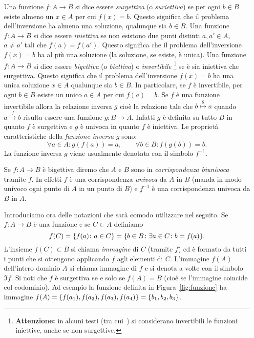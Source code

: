 Una funzione $f\colon A \to B$ si dice essere \emph{surgettiva}%
%
 (o \emph{suriettiva})
se per ogni $b\in B$ esiste almeno un $x\in A$ per cui $f(x)=b$. Questo
significa che il problema dell'inversione ha almeno una soluzione, qualunque
sia $b\in B$.
Una funzione $f\colon A \to B$ si dice essere \emph{iniettiva}%
%
se non esistono due punti distinti $a,a' \in A$, $a\neq a'$ tali
che $f(a) = f(a')$. Questo significa che il problema dell'inversione
$f(x)=b$ ha al più una soluzione (la soluzione, se esiste, è unica).
Una funzione $f\colon A \to B$ si dice essere \emph{bigettiva}%
%
(o \emph{biettiva})
%
%
%
%
%
%
o
\emph{invertibile}%
%
%
\footnote{\textbf{Attenzione:} in alcuni testi (tra cui~\cite{Giusti}) si considerano
invertibili le funzioni iniettive, anche se non surgettive.}
se è sia iniettiva che surgettiva. Questo significa
che il problema dell'inversione $f(x)=b$ ha una unica soluzione $x\in A$
qualunque sia $b\in B$. In particolare, se $f$ è invertibile, per ogni $b\in B$ esiste
un unico $a\in A$ per cui $f(a)=b$.
Se $f$ è una funzione invertibile allora la relazione inversa $g$
cioè la relazione tale che $b\stackrel g \mapsto a$ quando $a \stackrel f \mapsto b$
risulta essere una funzione $g\colon B\to A$. 
Infatti $g$ è definita su tutto $B$ in quanto $f$ è surgettiva 
e $g$ è univoca in quanto $f$ è iniettiva.
Le proprietà caratteristiche della \emph{funzione inversa}%
%
 $g$ sono:
\begin{equation}\label{eq:572098}
  \forall a\in A\colon g(f(a)) = a, \qquad
  \forall b\in B\colon f(g(b)) = b.
\end{equation}
La funzione inversa $g$ viene usualmente denotata con il simbolo $f^{-1}$.

Se $f\colon A\to B$ è bigettiva diremo che $A$ 
e $B$ sono in \emph{corrispondenza biunivoca}%
%
 tramite $f$.
In effetti $f$ è una corrispondenza \emph{univoca} da $A$ in $B$
(manda in modo univoco ogni punto di $A$ in un punto di $B$)
e $f^{-1}$ è una corrispondenza univoca da $B$ in $A$.

Introduciamo ora delle notazioni che sarà comodo utilizzare nel seguito.
Se $f\colon A \to B$ è una funzione e se $C\subset A$ definiamo
\[
  f(C) 
  = {\left\{ f(a)\colon a \in C \right\}} 
  = {\left\{ b\in B\colon \exists a\in C\colon b=f(a) \right\}}.
\]
L'insieme $f(C)\subset B$ si chiama \emph{immagine}%
%
%
di $C$ (tramite $f$) ed è formato
da tutti i punti che si ottengono applicando $f$ agli elementi di $C$.
L'immagine $f(A)$ dell'intero dominio $A$ si chiama immagine di $f$
e si denota a volte con il simbolo $\Im f$.
Si noti che $f$ è surgettiva se e solo se $f(A)=B$ (cioè se l'immagine coincide
col codominio).
Ad esempio la funzione definita in Figura~\ref{fig:funzione}
ha immagine $f(A) = {\left\{ f(a_1),f(a_2),f(a_3),f(a_4) \right\}} 
 = {\left\{ b_1, b_2, b_3 \right\}}$.

